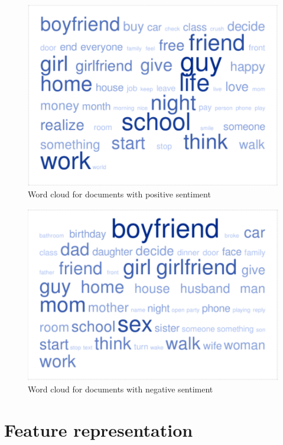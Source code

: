 \documentclass[11pt, letterpaper, conference, final, twocolumn]{ieeeconf}
\begin{document}
\begin{figure}[!htp]
\centering
\includegraphics[width= 0.8 \columnwidth]{fig/pos_cloud}
\caption{Word cloud for documents with positive sentiment}
\label{fig:pos_cloud}
\end{figure}
%
\begin{figure}[!htp]
\centering
\includegraphics[width= 0.8 \columnwidth]{fig/neg_cloud}
\caption{Word cloud for documents with negative sentiment}
\label{fig:neg_cloud}
\end{figure}

\section{Feature representation}
\label{sec:features}
\end{document}
